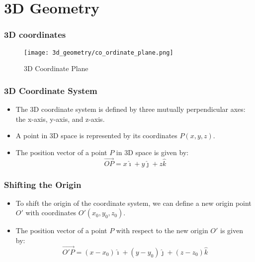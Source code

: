\section{3D Geometry}
\label{sec:3d_geometry}

\begin{frame}
    \frametitle{3D coordinates}
    \begin{figure}
        \texttt{[image: 3d\_geometry/co\_ordinate\_plane.png]}
        \caption{3D Coordinate Plane}
    \end{figure}
\end{frame}

\begin{frame}
    \frametitle{3D Coordinate System}
    \begin{itemize}
        \item The 3D coordinate system is defined by three mutually perpendicular axes: the x-axis, y-axis, and z-axis.
        \item A point in 3D space is represented by its coordinates \(P(x, y, z)\).
        \item The position vector of a point \(P\) in 3D space is given by:
        \[
        \vec{OP} = x\hat{\imath} + y\hat{\jmath} + z\hat{k}
        \]
    \end{itemize}       
\end{frame}

\begin{frame}
    \frametitle{Shifting the Origin}
    \begin{itemize}
        \item To shift the origin of the coordinate system, we can define a new origin point \(O'\) with coordinates \(O'(x_0, y_0, z_0)\).
        \item The position vector of a point \(P\) with respect to the new origin \(O'\) is given by:
        \[
        \vec{O'P} = (x - x_0)\hat{\imath} + (y - y_0)\hat{\jmath} + (z - z_0)\hat{k}
        \]
    \end{itemize}   
\end{frame}

